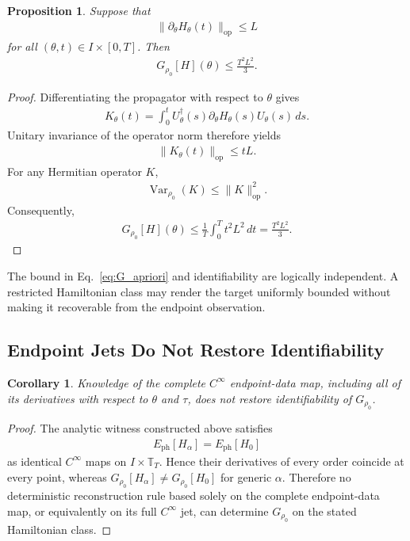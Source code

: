 \documentclass[twocolumn,prl,aps,floatfix]{revtex4-2}
\newtheorem{proposition}{Proposition}
\newtheorem{corollary}{Corollary}
\begin{document}
\begin{proposition}
Suppose that
\begin{align}
\|\partial_\theta H_\theta(t)\|_{\mathrm{op}}
\le L
\end{align}
for all $(\theta,t)\in I\times[0,T]$. Then
\begin{align}
G_{\rho_0}[H](\theta)
\le
\frac{T^2L^2}{3}.
\label{eq:G_apriori}
\end{align}
\end{proposition}

\begin{proof}
Differentiating the propagator with respect to $\theta$ gives
\begin{align}
K_\theta(t)
=
\int_0^t
U_\theta^\dagger(s)
\partial_\theta H_\theta(s)
U_\theta(s)\,ds .
\end{align}
Unitary invariance of the operator norm therefore yields
\begin{align}
\|K_\theta(t)\|_{\mathrm{op}}
\le tL .
\end{align}
For any Hermitian operator $K$,
\begin{align}
\operatorname{Var}_{\rho_0}(K)
\le
\|K\|_{\mathrm{op}}^2 .
\end{align}
Consequently,
\begin{align}
G_{\rho_0}[H](\theta)
\le
\frac{1}{T}
\int_0^T t^2L^2\,dt
=
\frac{T^2L^2}{3}.
\end{align}
\end{proof}

The bound in Eq.~\eqref{eq:G_apriori} and identifiability are logically independent. A restricted Hamiltonian class may render the target uniformly bounded without making it recoverable from the endpoint observation.

\subsection{Endpoint Jets Do Not Restore Identifiability}

\begin{corollary}
Knowledge of the complete $C^\infty$ endpoint-data map, including all of its derivatives with respect to $\theta$ and $\tau$, does not restore identifiability of $G_{\rho_0}$.
\end{corollary}

\begin{proof}
The analytic witness constructed above satisfies
\begin{align}
E_{\mathrm{ph}}[H_\alpha]
=
E_{\mathrm{ph}}[H_0]
\end{align}
as identical $C^\infty$ maps on $I\times\mathbb T_T$. Hence their derivatives of every order coincide at every point, whereas
$G_{\rho_0}[H_\alpha]\ne G_{\rho_0}[H_0]$ for generic $\alpha$. Therefore no deterministic reconstruction rule based solely on the complete endpoint-data map, or equivalently on its full $C^\infty$ jet, can determine $G_{\rho_0}$ on the stated Hamiltonian class.
\end{proof}
\end{document}
